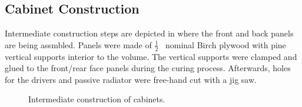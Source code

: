 \documentclass{StdTemplate} %
\begin{document}
\subsection{Cabinet Construction}
Intermediate construction steps are depicted in  where the front and back panels are being assmbled. Panels were made of $\frac{1}{2}$~\si{\in} nominal Birch plywood with pine vertical supports interior to the volume. The vertical supports were clamped and glued to the front/rear face panels during the curing process. Afterwards, holes for the drivers and passive radiator were free-hand cut with a jig saw.\par
%
\begin{figure}[h!]
\centering
{}
\qquad
{}
\caption{Intermediate construction of cabinets.}
\label{fig:sp_faces}
\end{figure}
\end{document}
